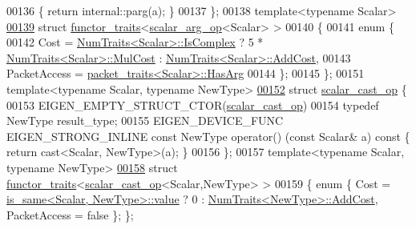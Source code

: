 \begin{DoxyCode}
00136 \textcolor{keyword}{  }\{ \textcolor{keywordflow}{return} internal::parg(a); \}
00137 \};
00138 \textcolor{keyword}{template}<\textcolor{keyword}{typename} Scalar>
\hyperlink{struct_eigen_1_1internal_1_1functor__traits_3_01scalar__arg__op_3_01_scalar_01_4_01_4}{00139} \textcolor{keyword}{struct }\hyperlink{struct_eigen_1_1internal_1_1functor__traits}{functor\_traits}<\hyperlink{struct_eigen_1_1internal_1_1scalar__arg__op}{scalar\_arg\_op}<Scalar> >
00140 \{
00141   \textcolor{keyword}{enum} \{
00142     Cost = \hyperlink{group___core___module_struct_eigen_1_1_num_traits}{NumTraits<Scalar>::IsComplex} ? 5 * 
      \hyperlink{group___core___module_struct_eigen_1_1_num_traits}{NumTraits<Scalar>::MulCost} : 
      \hyperlink{group___core___module_struct_eigen_1_1_num_traits}{NumTraits<Scalar>::AddCost},
00143     PacketAccess = \hyperlink{struct_eigen_1_1internal_1_1packet__traits}{packet\_traits<Scalar>::HasArg}
00144   \};
00145 \};
00151 \textcolor{keyword}{template}<\textcolor{keyword}{typename} Scalar, \textcolor{keyword}{typename} NewType>
\hyperlink{struct_eigen_1_1internal_1_1scalar__cast__op}{00152} \textcolor{keyword}{struct }\hyperlink{struct_eigen_1_1internal_1_1scalar__cast__op}{scalar\_cast\_op} \{
00153   EIGEN\_EMPTY\_STRUCT\_CTOR(\hyperlink{struct_eigen_1_1internal_1_1scalar__cast__op}{scalar\_cast\_op})
00154   \textcolor{keyword}{typedef} NewType result\_type;
00155   EIGEN\_DEVICE\_FUNC EIGEN\_STRONG\_INLINE \textcolor{keyword}{const} NewType operator() (\textcolor{keyword}{const} Scalar& a)\textcolor{keyword}{ const }\{ \textcolor{keywordflow}{return} 
      cast<Scalar, NewType>(a); \}
00156 \};
00157 \textcolor{keyword}{template}<\textcolor{keyword}{typename} Scalar, \textcolor{keyword}{typename} NewType>
\hyperlink{struct_eigen_1_1internal_1_1functor__traits_3_01scalar__cast__op_3_01_scalar_00_01_new_type_01_4_01_4}{00158} \textcolor{keyword}{struct }\hyperlink{struct_eigen_1_1internal_1_1functor__traits}{functor\_traits}<\hyperlink{struct_eigen_1_1internal_1_1scalar__cast__op}{scalar\_cast\_op}<Scalar,NewType> >
00159 \{ \textcolor{keyword}{enum} \{ Cost = \hyperlink{struct_eigen_1_1internal_1_1is__same}{is\_same<Scalar, NewType>::value} ? 0 : 
      \hyperlink{group___core___module_struct_eigen_1_1_num_traits}{NumTraits<NewType>::AddCost}, PacketAccess = \textcolor{keyword}{false} \}; \};

\end{DoxyCode}
